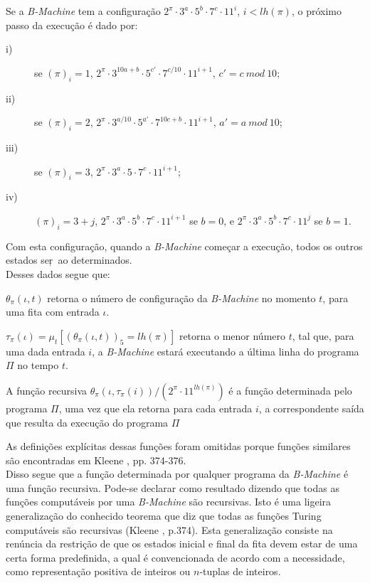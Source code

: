 \documentclass[10pt,letterpaper]{article}
\begin{document}
Se a \textit{B-Machine} tem a configura\c{c}\~{a}o $ 2^{\pi} \cdot 3^{a} \cdot 5^{b} \cdot 7^{c} \cdot 11^i $, $i < lh(\pi)$, o pr\'oximo passo da execu\c{c}\~{a}o \'e dado por:

\begin{description}
\item[i)] se $(\pi)_i = 1$, $2^{\pi} \cdot 3^{10a+b} \cdot 5^{c'} \cdot 7^{c/10} \cdot 11^{i+1}$, $c' = c\ mod\ 10$;

\item[ii)] se $(\pi)_i = 2$, $2^{\pi} \cdot 3^{a/10} \cdot 5^{a'} \cdot 7^{10c + b} \cdot 11^{i+1}$, $a' = a\ mod\ 10$;

\item[iii)] se $(\pi)_i = 3$, $2^{\pi} \cdot 3^{a} \cdot 5 \cdot 7^{c} \cdot 11^{i+1}$;

\item[iv)] $(\pi)_i = 3 + j$, $2^{\pi} \cdot 3^{a} \cdot 5^{b} \cdot 7^{c} \cdot 11^{i+1}$ se $b = 0$, e $2^{\pi} \cdot 3^{a} \cdot 5^{b} \cdot 7^{c} \cdot 11^{j}$ se $b = 1$.

\end{description}

Com esta configura\c{c}\~{a}o, quando a \textit{B-Machine} come\c{c}ar a execu\c{c}\~{a}o, todos os outros estados ser\c~{a}o determinados.\\

Desses dados segue que:

$\theta_\pi(\iota, t)$ retorna o n\'umero de configura\c{c}\~{a}o da \textit{B-Machine} no momento $t$, para uma fita com entrada $\iota$.

$\tau_\pi(\iota) = \mu_t[(\theta_\pi(\iota, t))_5 = lh(\pi)]$ retorna o menor n\'umero $t$, tal que, para uma dada entrada $i$, a \textit{B-Machine} estar\'a executando a \'ultima linha do programa $\Pi$ no tempo $t$.

A fun\c{c}\~{a}o recursiva $\theta_\pi(\iota,\tau_\pi(i))/(2^{\pi} \cdot 11^{lh(\pi)})$ \'e a fun\c{c}\~{a}o determinada pelo programa $\Pi$, uma vez que ela retorna para cada entrada $i$, a correspondente sa\'ida que resulta da execu\c{c}\~{a}o do programa $\Pi$

As defini\c{c}\~{o}es expl\'icitas dessas fun\c{c}\~{o}es foram omitidas porque fun\c{c}\~{o}es similares s\~{a}o encontradas em Kleene \cite{Kleene}, pp. 374-376.\\

Disso segue que a fun\c{c}\~{a}o determinada por qualquer programa da \textit{B-Machine} \'e uma fun\c{c}\~{a}o recursiva. Pode-se declarar como resultado dizendo que todas as fun\c{c}\~{o}es comput\'aveis por uma \textit{B-Machine} s\~{a}o recursivas. Isto \'e uma ligeira generaliza\c{c}\~{a}o do conhecido teorema que diz que todas as fun\c{c}\~{o}es Turing comput\'aveis s\~{a}o recursivas (Kleene \cite{Kleene}, p.374). Esta generaliza\c{c}\~{a}o consiste na ren\'uncia da restri\c{c}\~{a}o de que os estados inicial e final da fita devem estar de uma certa forma predefinida, a qual \'e convencionada de acordo com a necessidade, como representa\c{c}\~{a}o positiva de inteiros ou $n$-tuplas de inteiros.
\end{document}
